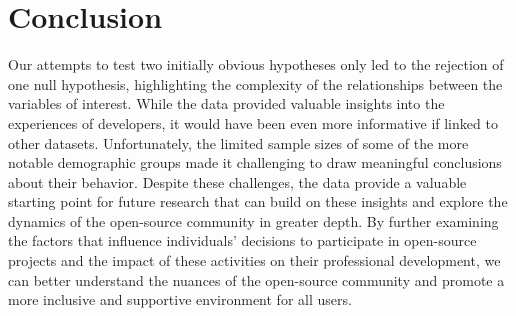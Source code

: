 \documentclass[journal,12pt,onecolumn,]{IEEEtran}
\begin{document}


\section{Conclusion}

Our attempts to test two initially obvious hypotheses only led to the rejection of one null hypothesis, highlighting the complexity of the relationships between the variables of interest. 
While the data provided valuable insights into the experiences of developers, it would have been even more informative if linked to other datasets. 
Unfortunately, the limited sample sizes of some of the more notable demographic groups made it challenging to draw meaningful conclusions about their behavior. 
Despite these challenges, the data provide a valuable starting point for future research that can build on these insights and explore the dynamics of the open-source community in greater depth. 
By further examining the factors that influence individuals' decisions to participate in open-source projects and the impact of these activities on their professional development, we can better understand the nuances of the open-source community and promote a more inclusive and supportive environment for all users.



\end{document}
